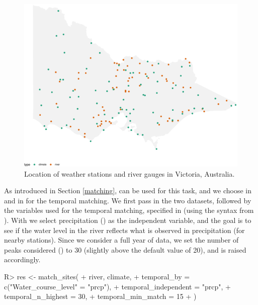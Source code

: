 \documentclass[
]{jss}
\begin{document}
\begin{CodeChunk}
\begin{figure}

{\centering \includegraphics{figures/matching-map-1} 

}

\caption[Location of weather stations and river gauges in Victoria, Australia]{Location of weather stations and river gauges in Victoria, Australia.}\label{fig:matching-map}
\end{figure}
\end{CodeChunk}

As introduced in Section \ref{matching},  can be used for this task, and we choose  in  and  in  for the temporal matching. We first pass in the two datasets, followed by the variables used for the temporal matching, specified in  (using the  syntax from ). With  we select precipitation () as the independent variable, and the goal is to see if the water level in the river reflects what is observed in precipitation (for nearby stations). Since we consider a full year of data, we set the number of peaks considered () to 30 (slightly above the default value of 20), and  is raised accordingly.

\begin{CodeChunk}
\begin{CodeInput}
R> res <- match_sites(
+   river, climate,
+   temporal_by = c("Water_course_level" = "prcp"),
+   temporal_independent = "prcp",  
+   temporal_n_highest = 30,
+   temporal_min_match = 15
+ )
\end{CodeInput}
\end{CodeChunk}
\end{document}
